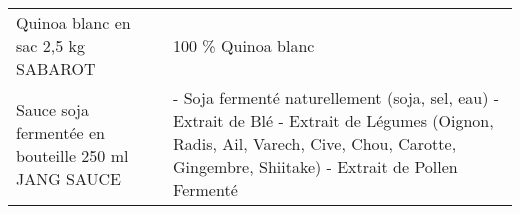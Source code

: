 \begin{longtable}{p{5cm}p{10cm}}
                                                                       Quinoa blanc en sac 2,5 kg SABAROT &                                                                                                                                                                                                                                                                                                                                                                                                                                                                                                                                                                                                                                                                                                                                                                                                                                                                                                                                                                                                                       100 \% Quinoa blanc \\
                                                      Sauce soja fermentée en bouteille 250 ml JANG SAUCE &                                                                                                                                                                                                                                                                                                                                                                                                                                                                                                                                                                                                                                                                                                                                                                                                                                              - Soja fermenté naturellement (soja, sel, eau)  - Extrait de Blé  - Extrait de Légumes (Oignon, Radis, Ail, Varech, Cive, Chou, Carotte, Gingembre, Shiitake)  - Extrait de Pollen Fermenté \\

\end{longtable}
